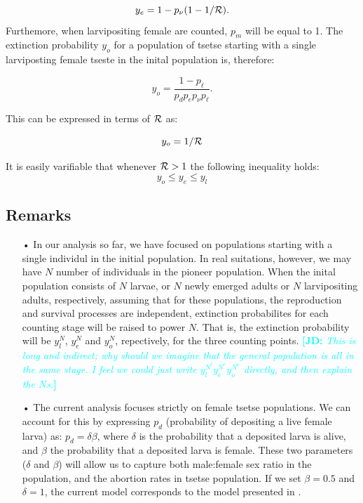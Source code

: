 \documentclass[smallextended]{svjour3}
\newcommand{\comment}[3]{\textcolor{#1}{\textbf{[#2: }\textit{#3}\textbf{]}}}
\newcommand{\jd}[1]{\comment{cyan}{JD}{#1}}
\newcommand{\eb}[1]{\comment{blue}{EB}{#1}}
\begin{document}
\begin{equation}
\label{NewEqn2}
y_e = 1 - p_{\nu}(1-1/{\cal R}).	
\end{equation}
Furthemore, when  larvipositing female are counted, $p_m$ will be equal to 1. The extinction probability $y_o$ for a population of tsetse starting with a single larviposting female tseste in the inital population is, therefore:

 $$y_o = \frac{1-p_{\ell}}{p_{d}p_{e}p_{\nu}p_{\ell}}.$$

This can be expressed in terms of ${\cal R}$ as:

\begin{equation}
\label{NewEqn3}
y_o = 1/{\cal R}	
\end{equation}

It is easily varifiable that whenever ${\cal R}>1$ the following inequality holds:
\begin{equation}
\label{Aretsetsetheorem}
y_{o}\leq y_{e} \leq y_{l}
\end{equation} 


\subsection*{\bf Remarks}
\begin{itemize}
	\item[•] In our analysis so far, we have focused on populations starting with a single individul in the initial population. In real suitations, however, we may have $N$ number of individuals in the pioneer population. When the inital population consists of $N$ larvae, or $N$ newly emerged adults or $N$ larvipositing adults, respectively, assuming that for these populations, the reproduction and survival processes are independent, extinction probabilites for each counting stage will be raised to power $N$. That is, the extinction probability will be $y_l^N$, $y_e^N$ and $y_o^N$, repectively, for the three counting points. \jd{This is long and indirect; why should we imagine that the general population is all in the same stage. I feel we could just write $y_l^{N^l} y_e^{N^e} y_o^{N^o}$ directly, and then explain the $N$s.}
\item[•] The current analysis focuses strictly on female tsetse populations. We can account for this  by expressing  $p_d$ (probability of depositing a live female larva) as:  $p_d =\delta \beta$, where $\delta$ is the probability that a deposited larva is alive, and $\beta$ the probability that a deposited larva is female.  These two parameters ($\delta$ and $\beta$) will allow us to capture both male:female sex ratio in the population, and  the abortion rates in tsetse population.  If we set $\beta = 0.5$ and $\delta = 1$, the current model corresponds to the model presented in \cite{Hargrove2005a}. 
\end{itemize}
\end{document}
